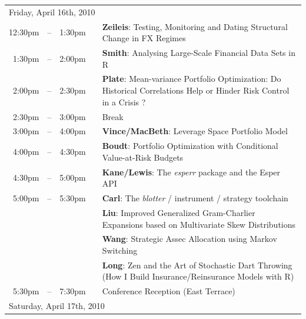 \documentclass[11pt]{article}
\newcommand{\mylinecolor}[1]{\color{#1}\vspace{-8pt}}  %
\begin{document}
 
\begin{tabular}{rlrlp{5in}} %
  \multicolumn{5}{l}{\Large Friday, April 16th, 2010} \\

  \phantom{X} 12:30pm&--&1:30pm & \phantom{l} & \textbf{\color{KeynoteTalk} Zeileis}: \small{Testing, Monitoring and Dating Structural Change in FX Regimes} \\
  1:30pm & -- & 2:00pm &    & \textbf{\color{Talk} Smith}: \small{Analysing Large-Scale Financial Data Sets in R} \\
  2:00pm & -- & 2:30pm &    & \textbf{\color{Talk} Plate}: \small{Mean-variance Portfolio Optimization: Do Historical Correlations Help or Hinder Risk Control in a Crisis ?} \\[0pt]
  2:30pm & -- & 3:00pm &    & \small{\mylinecolor{Breaks} Break} \\
  3:00pm & -- & 4:00pm &    & \textbf{\color{KeynoteTalk} Vince/MacBeth}: \small{Leverage Space Portfolio Model} \\
  4:00pm & -- & 4:30pm &    & \textbf{\color{Talk} Boudt}: \small{Portfolio Optimization with Conditional Value-at-Risk Budgets} \\
  4:30pm & -- & 5:00pm &    & \textbf{\color{Talk} Kane/Lewis}: \small{The \emph{esperr} package and the Esper API} \\
  5:00pm & -- & 5:30pm &    & \textbf{\color{LightningTalk} Carl}: \small{The \emph{blotter} / instrument / strategy toolchain} \\
         &    &        &    & \textbf{\color{LightningTalk} Liu}: \small{Improved Generalized Gram-Charlier Expansions based on Multivariate Skew Distributions} \\
         &    &        &    & \textbf{\color{LightningTalk} Wang}: \small{Strategic Assec Allocation using Markov Switching} \\
         &    &        &    & \textbf{\color{LightningTalk} Long}: \small{Zen and the Art of Stochastic Dart Throwing (How I Build Insurance/Reinsurance Models with R)} \\[0pt]
  5:30pm & -- & 7:30pm &    & \small{\mylinecolor{Breaks} Conference Reception (East Terrace)}  \\[18pt]

  \multicolumn{5}{l}{\Large Saturday, April 17th, 2010} \\


\end{tabular}
\end{document}
